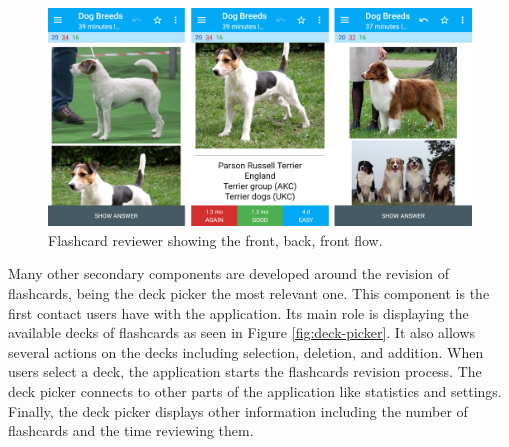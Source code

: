 \begin{figure}[htb]
    \vskip 5mm
        \begin{center}
            \includegraphics[scale=0.28]{./Figures/reviewer.png}
            \caption{Flashcard reviewer showing the front, back, front flow.}
            \label{fig:front-back-assess}
        \end{center}
    \vskip -5mm
\end{figure}

Many other secondary components are developed around the revision of flashcards, being the deck picker the most relevant one. This component is the first contact users have with the application. Its main role is displaying the available decks of flashcards as seen in Figure \ref{fig:deck-picker}. It also allows several actions on the decks including selection, deletion, and addition. When users select a deck, the application starts the flashcards revision process. The deck picker connects to other parts of the application like statistics and settings. Finally, the deck picker displays other information including the number of flashcards and the time reviewing them.


